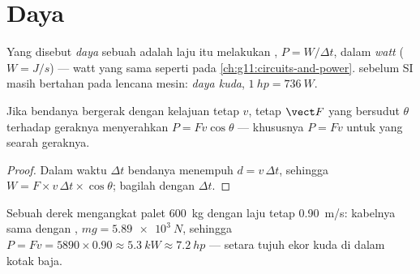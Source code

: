 \section{Daya}

\begin{definition}[Daya]\label{def:g11:work-of-force:power}
Yang disebut \emph{daya} sebuah  adalah laju 
itu melakukan , $P = W/\Delta t$, dalam \emph{watt}
($\unit{W} = \unit{J/s}$) --- watt yang sama seperti pada
\cref{ch:g11:circuits-and-power}.  sebelum SI masih bertahan pada
lencana mesin: \emph{daya kuda},
$\qty{1}{hp} = \qty{736}{W}$.
\end{definition}

\begin{proposition}\label{prop:g11:work-of-force:pfv}
Jika bendanya bergerak dengan kelajuan tetap $v$,  tetap $\vect F$
yang bersudut $\theta$ terhadap geraknya menyerahkan 
$P = F v \cos\theta$ --- khususnya $P = Fv$ untuk  yang searah
geraknya.
\end{proposition}

\begin{proof}
Dalam waktu $\Delta t$ bendanya menempuh $d = v\,\Delta t$, sehingga
$W = F \times v\,\Delta t \times \cos\theta$; bagilah dengan
$\Delta t$.
\end{proof}

\begin{example}[Derek]\label{ex:g11:work-of-force:crane}
Sebuah derek mengangkat palet \qty{600}{kg} dengan laju tetap
\qty{0.90}{m/s}:  kabelnya sama dengan ,
$mg = \qty{5.89e3}{N}$, sehingga
$P = Fv = 5890 \times 0.90 \approx \qty{5.3}{kW} \approx \qty{7.2}{hp}$
--- setara tujuh ekor kuda di dalam kotak baja.
\end{example}

